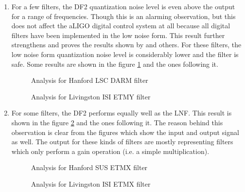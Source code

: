 \documentclass[colorlinks=true,pdfstartview=FitV,linkcolor=blue,
            citecolor=red,urlcolor=magenta]{ligodoc}
\begin{document}
\begin{enumerate}
		\item For a few filters, the DF2 quantization noise level is even above the output for a range of frequencies.  Though this is an alarming observation, but this does not affect the aLIGO digital control system at all because all digital filters have been implemented in the low noise form. This result further strengthens and proves the results shown by \cite{Matts} and others. For these filters, the low noise form quantization noise level is considerably lower and the filter is safe. Some results are shown in the figure \ref{dfbad} and the ones following it.
		\begin{figure}[H]
 
			  \centering
			  \def\svgscale{0.5}
			  \tiny{
			  
			  }
			  \caption{Analysis for Hanford LSC DARM filter}
			 \label{dfbad}
		\end{figure}
		\begin{figure}[H]
 
			  \centering
			  \def\svgscale{0.5}
			  \tiny{
			  
			  }
			  \caption{Analysis for Livingston ISI ETMY filter}
		\end{figure}
		
		\item For some filters, the DF2 performs equally well as the LNF. This result is shown in the figure \ref{bqfdf} and the ones following it. The reason behind this observation is clear from the figures which show the input and output signal as well. The output for these kinds of filters are mostly representing filters which only perform a gain operation (i.e. a simple multiplication).
		\begin{figure}[H]
 
			  \centering
			  \def\svgscale{0.5}
			  \tiny{
			  
			  }
			  \caption{Analysis for Hanford SUS ETMX filter}
			 \label{bqfdf}
		\end{figure}
		\begin{figure}[H]
 
			  \centering
			  \def\svgscale{0.5}
			  \tiny{
			  
			  }
			  \caption{Analysis for Livingston ISI ETMX filter}
		\end{figure}
	\end{enumerate}
\end{document}
